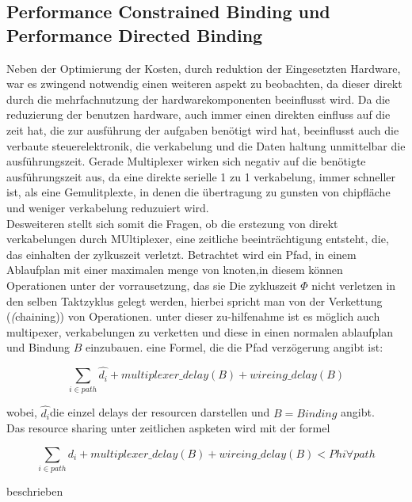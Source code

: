 \documentclass[conference]{IEEEtran}
\begin{document}
 \subsection{Performance Constrained Binding und Performance Directed Binding}
Neben der Optimierung der Kosten, durch reduktion der Eingesetzten Hardware, war es zwingend notwendig einen weiteren aspekt zu beobachten, da dieser direkt durch die mehrfachnutzung der hardwarekomponenten beeinflusst wird.
Da die reduzierung der benutzen hardware, auch immer einen direkten einfluss auf die zeit hat, die zur ausführung der aufgaben benötigt wird hat, beeinflusst auch die verbaute steuerelektronik, die verkabelung und die Daten haltung unmittelbar die ausführungszeit. Gerade Multiplexer wirken sich negativ auf die benötigte ausführungszeit aus, da eine direkte serielle 1 zu 1 verkabelung, immer schneller ist, als eine Gemulitplexte, in denen die übertragung zu gunsten von chipfläche und weniger verkabelung reduzuiert wird.\\
Desweiteren stellt sich somit die Fragen,  ob die erstezung von direkt verkabelungen durch MUltiplexer, eine zeitliche beeinträchtigung entsteht, die, das einhalten der zylkuszeit verletzt.
Betrachtet wird ein Pfad, in einem Ablaufplan mit einer maximalen menge von knoten,in diesem können Operationen unter der vorrausetzung, das sie Die zykluszeit $\Phi$ nicht verletzen in den selben Taktzyklus gelegt werden, hierbei spricht man von der Verkettung (\textit(chaining)) von Operationen\cite[S.249]{3}. unter dieser zu-hilfenahme ist es möglich auch multipexer, verkabelungen zu verketten und diese in einen normalen ablaufplan  und Bindung $B$ einzubauen. 
eine Formel, die die Pfad verzögerung angibt ist:\\
\begin{center}
\begin{equation}
\sum_{i\in path} \widehat{d_i} + multiplexer\_delay(B) + wireing\_delay(B)
\end{equation}
\end{center}
wobei, $\widehat{d_i} $die einzel delays der resourcen darstellen und $B = Binding$ angibt.\\
Das resource sharing unter zeitlichen aspketen wird mit der formel 
\begin{center}
\begin{equation}
\sum_{i\in path}d_i + multiplexer\_delay(B) + wireing\_delay(B) < Phi  \forall path
\end{equation}
\end{center}
 beschrieben \cite[S.249]{3}
\end{document}

